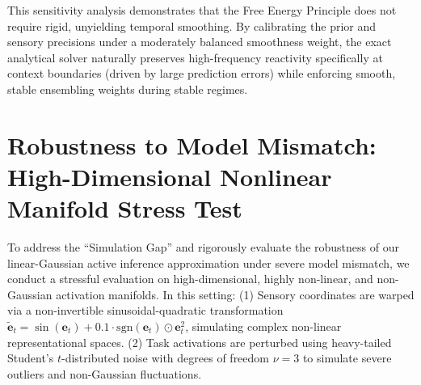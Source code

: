 \documentclass{article}
\theoremstyle{plain}
\theoremstyle{definition}
\theoremstyle{remark}
\begin{document}
This sensitivity analysis demonstrates that the Free Energy Principle does not require rigid, unyielding temporal smoothing. By calibrating the prior and sensory precisions under a moderately balanced smoothness weight, the exact analytical solver naturally preserves high-frequency reactivity specifically at context boundaries (driven by large prediction errors) while enforcing smooth, stable ensembling weights during stable regimes.



\section{Robustness to Model Mismatch: High-Dimensional Nonlinear Manifold Stress Test}
\label{app:nonlinear_stress_test}

To address the ``Simulation Gap'' and rigorously evaluate the robustness of our linear-Gaussian active inference approximation under severe model mismatch, we conduct a stressful evaluation on high-dimensional, highly non-linear, and non-Gaussian activation manifolds. In this setting:
(1) Sensory coordinates are warped via a non-invertible sinusoidal-quadratic transformation $\tilde{\mathbf{e}}_t = \sin(\mathbf{e}_t) + 0.1 \cdot \text{sgn}(\mathbf{e}_t) \odot \mathbf{e}_t^2$, simulating complex non-linear representational spaces.
(2) Task activations are perturbed using heavy-tailed Student's $t$-distributed noise with degrees of freedom $\nu = 3$ to simulate severe outliers and non-Gaussian fluctuations.
\end{document}
